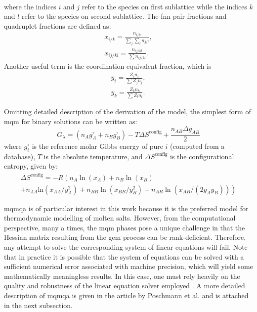 \begin{enumerate}
\begin{gather}
        \end{gather}
        where the indices $i$ and $j$ refer to the species on first sublattice while the indices $k$ and $l$ refer to the species on second sublattice.
        The \gls{fnn} pair fractions and quadruplet fractions are defined as:
        \begin{gather} \label{EqPairFraction}
            x_{i/k} = \frac{n_{i/k}}{\sum_j \sum_l n_{j/l}}, \\
            x_{ij/kl} = \frac{n_{ij/kl}}{\sum n_{ij/kl}}.
        \end{gather}
        Another useful term is the coordination equivalent fraction, which is
            \begin{gather} \label{EqCoordEqFraction}
	            y_i = \frac{Z_i n_i}{\sum Z_j n_j}, \\
	            y_k = \frac{Z_k n_k}{\sum Z_l n_l}.
            \end{gather}
	\end{enumerate}
	Omitting detailed description of the derivation of the model, the simplest form of \gls{mqm} for binary solutions can be written as:
	\begin{equation} \label{EqGibbsMQM1}
		G_{\lambda} = (n_A g_A^\circ + n_B g_B^\circ) - T\Delta S^\text{config} + \frac{n_{AB} \Delta g_{AB}}{2}
	\end{equation}
	where $g_i^\circ$ is the reference molar Gibbs energy of pure $i$ (computed from a database), $T$ is the absolute temperature, and $\Delta S^\text{config}$ is the configurational entropy, given by:
	\begin{multline} \label{EqConfigEntropy}
		\Delta S^\text{config} = -R\left( n_A \ln(x_A) + n_B \ln(x_B) \right . \\
		+ \left . n_{AA}\textrm{ln}(x_{AA}/y_A^2) + n_{BB}\ln(x_{BB}/y_B^2) +n_{AB}\ln(x_{AB}/(2y_A y_B)) \right)
	\end{multline}

	\gls{mqmqa} is of particular interest in this work because it is the preferred model for thermodynamic modelling of molten salts. However, from the computational perspective, many a times, the \gls{mqm} phases pose a unique challenge in that the Hessian matrix resulting from the \gls{gem} process can be rank-deficient. Therefore, any attempt to solve the corresponding system of linear equations will fail. Note that in practice it is possible that the system of equations can be solved with a sufficient numerical error associated with machine precision, which will yield some mathematically meaningless results. In this case, one must rely heavily on the quality and robustness of the linear equation solver employed \cite{Piro:2019aa}. A more detailed description of \gls{mqmqa} is given in the article by Poschmann et al. \cite{Poschmann:2021ab} and is attached in the next subsection.%
	
